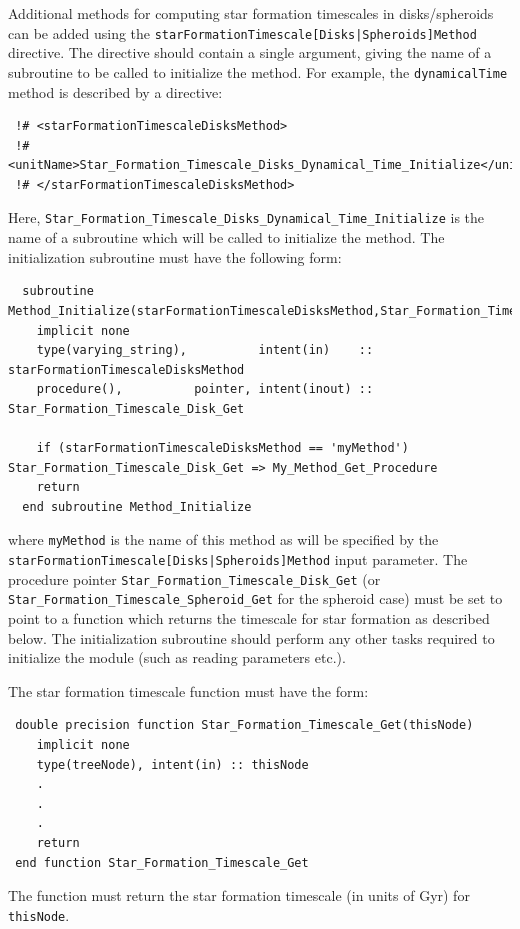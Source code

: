 Additional methods for computing star formation timescales in disks/spheroids can be added using the {\tt starFormationTimescale[Disks|Spheroids]Method} directive. The directive should contain a single argument, giving the name of a subroutine to be called to initialize the method. For example, the {\tt dynamicalTime} method is described by a directive:
\begin{verbatim}
 !# <starFormationTimescaleDisksMethod>
 !#  <unitName>Star_Formation_Timescale_Disks_Dynamical_Time_Initialize</unitName>
 !# </starFormationTimescaleDisksMethod>
\end{verbatim}
Here, {\tt Star\_Formation\_Timescale\_Disks\_Dynamical\_Time\_Initialize} is the name of a subroutine which will be called to initialize the method. The initialization subroutine must have the following form:
\begin{verbatim}
  subroutine Method_Initialize(starFormationTimescaleDisksMethod,Star_Formation_Timescale_Disk_Get)
    implicit none
    type(varying_string),          intent(in)    :: starFormationTimescaleDisksMethod
    procedure(),          pointer, intent(inout) :: Star_Formation_Timescale_Disk_Get
    
    if (starFormationTimescaleDisksMethod == 'myMethod') Star_Formation_Timescale_Disk_Get => My_Method_Get_Procedure
    return
  end subroutine Method_Initialize
\end{verbatim}
where {\tt myMethod} is the name of this method as will be specified by the {\tt starFormationTimescale[Disks|Spheroids]Method} input parameter. The procedure pointer {\tt Star\_Formation\_Timescale\_Disk\_Get} (or {\tt Star\_Formation\_Timescale\_Spheroid\_Get} for the spheroid case) must be set to point to a function which returns the timescale for star formation as described below. The initialization subroutine should perform any other tasks required to initialize the module (such as reading parameters etc.).

The star formation timescale function must have the form:
\begin{verbatim}
 double precision function Star_Formation_Timescale_Get(thisNode)
    implicit none
    type(treeNode), intent(in) :: thisNode
    .
    .
    .
    return
 end function Star_Formation_Timescale_Get
\end{verbatim}
The function must return the star formation timescale (in units of Gyr) for {\tt thisNode}.

